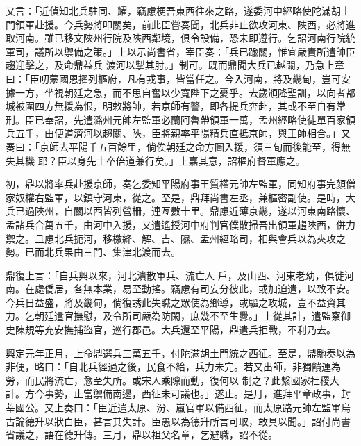 \begin{pinyinscope}
 又言：「近偵知北兵駐同、耀，竊慮梗吾東西往來之路，遂委河中經略使陀滿胡土門領軍赴援。今兵勢將叩關矣，前此臣嘗奏聞，北兵非止欲攻河東、陜西，必將進取河南。雖已移文陜州行院及陜西鄰境，俱令設備，恐未即遵行。乞詔河南行院統軍司，議所以禦備之策。」上以示尚書省，宰臣奏：「兵已踰關，惟宜嚴責所遣帥臣趨迎擊之，及命鼎益兵
 渡河以掣其肘。」制可。既而鼎聞大兵已越關，乃急上章曰：「臣叨蒙國恩擢列樞府，凡有戎事，皆當任之。今入河南，將及畿甸，豈可安據一方，坐視朝廷之急，而不思自奮以少寬陛下之憂乎。去歲頒降聖訓，以向者都城被圍四方無援為恨，明敕將帥，若京師有警，即各提兵奔赴，其或不至自有常刑。臣已奉詔，先遣潞州元帥左監軍必蘭阿魯帶領軍一萬，孟州經略使徒單百家領兵五千，由便道濟河以趨關、陜，臣將親率平陽精兵直抵京師，與王師相合。」又奏曰：「京師去平陽千五百餘里，倘俟朝廷之命方圖入援，須三旬而後能至，得無失其機
 耶？臣以身先士卒倍道兼行矣。」上嘉其意，詔樞府督軍應之。



 初，鼎以將率兵赴援京師，奏乞委知平陽府事王質權元帥左監軍，同知府事完顏僧家奴權右監軍，以鎮守河東，從之。至是，鼎拜尚書左丞，兼樞密副使。是時，大兵已過陜州，自關以西皆列營柵，連亙數十里。鼎慮近薄京畿，遂以河東南路懷、孟諸兵合萬五千，由河中入援，又遣遙授河中府判官僕散掃吾出領軍趨陜西，併力禦之。且慮北兵扼河，移檄絳、解、吉、隰、孟州經略司，相與會兵以為夾攻之勢。已而北兵果由三門、集津北渡而去。



 鼎復上言：「自兵興以來，河北潰散軍兵、流亡人
 戶，及山西、河東老幼，俱徙河南。在處僑居，各無本業，易至動搖。竊慮有司妄分彼此，或加迫遣，以致不安。今兵日益盛，將及畿甸，倘復誘此失職之眾使為鄉導，或驅之攻城，豈不益資其力。乞朝廷遣官撫慰，及令所司嚴為防閑，庶幾不至生釁。」上從其計，遣監察御史陳規等充安撫捕盜官，巡行郡邑。大兵還至平陽，鼎遣兵拒戰，不利乃去。



 興定元年正月，上命鼎選兵三萬五千，付陀滿胡土門統之西征。至是，鼎馳奏以為非便，略曰：「自北兵經過之後，民食不給，兵力未完。若又出師，非獨饋運為勞，而民將流亡，愈至失所。或宋人乘隙而動，復何以
 制之？此繫國家社稷大計。方今事勢，止當禦備南邊，西征未可議也。」遂止。是月，進拜平章政事，封莘國公。又上奏曰：「臣近遣太原、汾、嵐官軍以備西征，而太原路元帥左監軍烏古論德升以狀白臣，甚言其失計。臣愚以為德升所言可取，敢具以聞。」詔付尚書省議之，語在德升傳。三月，鼎以祖父名章，乞避職，詔不從。




\end{pinyinscope}
